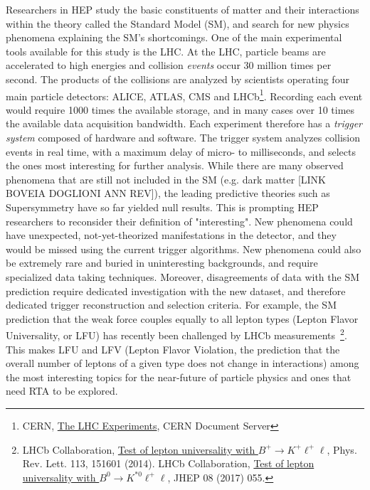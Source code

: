 Researchers in HEP study the basic constituents of matter and their interactions within the theory called the Standard Model (SM), and search for new physics phenomena explaining the SM's shortcomings. 
One of the main experimental tools available for this study is the LHC. 
At the LHC, particle beams are accelerated to high energies and 
collision \textit{events} occur 30 million times per second. 
The products of the collisions are analyzed by scientists operating four main particle detectors: ALICE, ATLAS, CMS and LHCb\footnote{CERN, \href{http://cds.cern.ch/record/1997374}{The LHC Experiments}, CERN Document Server}.
Recording each event would require 1000 times the available storage, and in many cases over 10 times the available data acquisition bandwidth.
Each experiment therefore has a \textit{trigger system} composed of hardware and software.
The trigger system analyzes collision events in real time, with a maximum delay of micro- to milliseconds, and selects the ones most interesting for further analysis. 
While there are many observed phenomena that are still not included in the SM (e.g. dark matter [LINK BOVEIA DOGLIONI ANN REV]), the leading predictive theories such as Supersymmetry have so far yielded null results. 
This is prompting HEP researchers to reconsider their definition of "interesting". 
New phenomena could have unexpected, not-yet-theorized manifestations in the detector, and they would be missed using the current trigger algorithms. 
New phenomena could also be extremely rare and buried in uninteresting backgrounds, and require specialized data taking techniques. 
Moreover, disagreements of data with the SM prediction require dedicated investigation with the new dataset, and therefore dedicated trigger reconstruction and selection criteria. 
For example, the SM prediction that the weak force couples equally to all lepton types (Lepton Flavor Universality, or LFU) has recently been challenged by LHCb measurements~\footnote{LHCb Collaboration, \href{https://arxiv.org/abs/1705.05802}{Test of lepton universality with $ B^{+}\rightarrow K^{+}\ell^{+}\ell$}, Phys. Rev. Lett. 113, 151601 (2014). LHCb Collaboration, \href{https://arxiv.org/abs/1705.05802}{Test of lepton universality with $B^{0}\rightarrow K^{* 0}\ell^{+}\ell$}, JHEP 08 (2017) 055.}. This makes LFU and LFV (Lepton Flavor Violation, the prediction that the overall number of leptons of a given type does not change in interactions) among the most interesting topics for the near-future of particle physics and ones that need RTA to be explored. 

